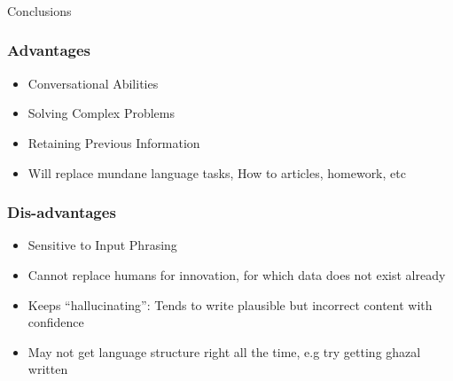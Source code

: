 \begin{frame}[fragile]\frametitle{}
\begin{center}
{\Large Conclusions}
\end{center}
\end{frame}




\begin{frame}[fragile]\frametitle{Advantages}


\begin{itemize}
\item Conversational Abilities
\item Solving Complex Problems
\item Retaining Previous Information
\item Will replace mundane language tasks, How to articles, homework, etc
\end{itemize}	 

\end{frame}

\begin{frame}[fragile]\frametitle{Dis-advantages}


\begin{itemize}
\item Sensitive to Input Phrasing
\item Cannot replace humans for innovation, for which data does not exist already
\item Keeps ``hallucinating'': Tends to write plausible but incorrect content with confidence
\item May not get language structure right all the time, e.g try getting ghazal written
\end{itemize}	 

\end{frame}

